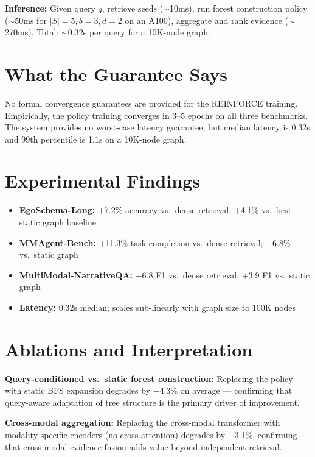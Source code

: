 \documentclass[10pt,twocolumn]{article}
\begin{document}
\textbf{Inference:} Given query $q$, retrieve seeds ($\sim$10ms),
run forest construction policy ($\sim$50ms for $|S|=5, b=3, d=2$
on an A100), aggregate and rank evidence ($\sim$270ms). Total:
$\sim$0.32s per query for a 10K-node graph.

\section{What the Guarantee Says}

No formal convergence guarantees are provided for the REINFORCE
training. Empirically, the policy training converges in 3--5
epochs on all three benchmarks. The system provides no worst-case
latency guarantee, but median latency is 0.32s and 99th percentile
is 1.1s on a 10K-node graph.

\section{Experimental Findings}

\begin{itemize}[itemsep=2pt,parsep=0pt]
  \item \textbf{EgoSchema-Long:} $+$7.2\% accuracy vs.\ dense retrieval;
    $+$4.1\% vs.\ best static graph baseline
  \item \textbf{MMAgent-Bench:} $+$11.3\% task completion vs.\ dense
    retrieval; $+$6.8\% vs.\ static graph
  \item \textbf{MultiModal-NarrativeQA:} $+$6.8 F1 vs.\ dense retrieval;
    $+$3.9 F1 vs.\ static graph
  \item \textbf{Latency:} 0.32s median; scales sub-linearly with graph
    size to 100K nodes
\end{itemize}

\section{Ablations and Interpretation}

\textbf{Query-conditioned vs.\ static forest construction:}
Replacing the policy with static BFS expansion degrades by $-$4.3\%
on average — confirming that query-aware adaptation of tree structure
is the primary driver of improvement.

\textbf{Cross-modal aggregation:} Replacing the cross-modal transformer
with modality-specific encoders (no cross-attention) degrades by
$-$3.1\%, confirming that cross-modal evidence fusion adds value
beyond independent retrieval.
\end{document}
